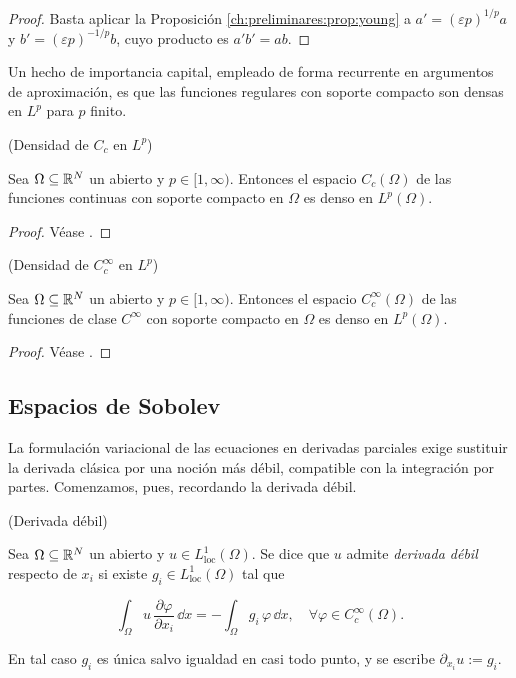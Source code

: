 \begin{proof}
Basta aplicar la Proposición \ref{ch:preliminares:prop:young} a
$a' = (\varepsilon p)^{1/p} a$ y $b' = (\varepsilon p)^{-1/p} b$, cuyo producto es
$a'b' = ab$.
\end{proof}

Un hecho de importancia capital, empleado de forma recurrente en argumentos de
aproximación, es que las funciones regulares con soporte compacto son densas en
$L^p$ para $p$ finito.\\

\begin{Proposicion}{(Densidad de $C_c$ en $L^p$)}
\label{ch:preliminares:prop:densidadCc}

Sea $\Omega \subseteq \mathbb{R}^N$ un abierto y $p \in [1, \infty)$. Entonces el espacio
$C_c(\Omega)$ de las funciones continuas con soporte compacto en $\Omega$ es denso
en $L^p(\Omega)$.
\end{Proposicion}

\begin{proof}
Véase \cite[Teorema~4.12]{brezis-2011-fun-ana-sob}.
\end{proof}

\begin{Proposicion}{(Densidad de $C_c^\infty$ en $L^p$)}
\label{ch:preliminares:prop:densidadCcInf}

Sea $\Omega \subseteq \mathbb{R}^N$ un abierto y $p \in [1, \infty)$. Entonces el espacio
$C_c^\infty(\Omega)$ de las funciones de clase $C^\infty$ con soporte compacto en
$\Omega$ es denso en $L^p(\Omega)$.
\end{Proposicion}

\begin{proof}
Véase \cite[Corolario~4.23]{brezis-2011-fun-ana-sob}.
\end{proof}

\subsection{Espacios de Sobolev}
\label{ch:preliminares:subsection:Sobolev}

La formulación variacional de las ecuaciones en derivadas parciales exige
sustituir la derivada clásica por una noción más débil, compatible con la
integración por partes. Comenzamos, pues, recordando la derivada débil.\\

\begin{Definicion}{(Derivada débil)}
\label{ch:preliminares:def:derivadaDebil}

Sea $\Omega \subseteq \mathbb{R}^N$ un abierto y $u \in L^1_{\mathrm{loc}}(\Omega)$. Se
dice que $u$ admite \textit{derivada débil} respecto de $x_i$ si existe
$g_i \in L^1_{\mathrm{loc}}(\Omega)$ tal que

\[\int_\Omega u \, \frac{\partial \varphi}{\partial x_i} \, \dd x = -\int_\Omega g_i \, \varphi \, \dd x, \quad \forall \varphi \in C_c^\infty(\Omega).\]

En tal caso $g_i$ es única salvo igualdad en casi todo punto, y se escribe
$\partial_{x_i} u := g_i$.
\end{Definicion}

